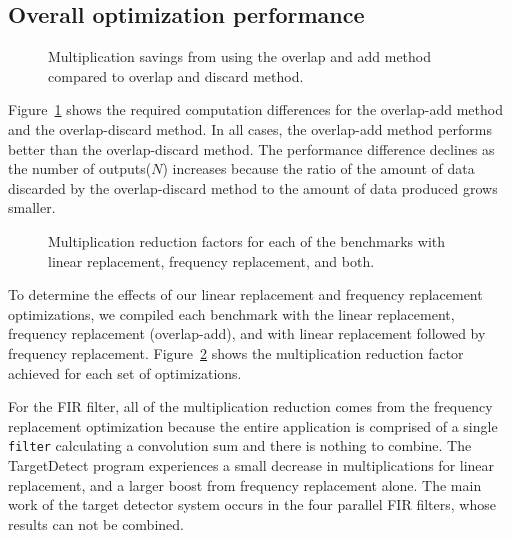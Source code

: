 \subsection{Overall optimization performance}

\begin{figure}
\center
\epsfxsize=3.2in
\vspace{-12pt}
\caption{Multiplication savings from using the overlap and add method compared to overlap and discard method.}
\label{fig:overlap-add-savings}
\vspace{-12pt}
\end{figure}

Figure~\ref{fig:overlap-add-savings} shows the required computation differences for
the overlap-add method and the overlap-discard method. 
In all cases, the overlap-add method performs better than the overlap-discard method.
The performance difference declines as the number of outputs($N$) increases because
the ratio of the amount of data discarded by the overlap-discard method to the 
amount of data produced grows smaller. 

\begin{figure}
\center
\epsfxsize=3.2in
\vspace{-6pt}
\caption{Multiplication reduction factors for each of the benchmarks with linear replacement, frequency replacement, and both.}
\label{fig:linear-freq-both}
\vspace{-12pt}
\end{figure}

To determine the effects of our linear replacement and frequency replacement 
optimizations, we compiled each benchmark with the linear 
replacement, frequency replacement (overlap-add),
and with linear replacement followed by frequency replacement. 
Figure~\ref{fig:linear-freq-both} shows the multiplication reduction factor 
achieved for each set of optimizations.

For the FIR filter, all of the multiplication reduction comes from the frequency
replacement optimization because the entire application is comprised of a single
{\tt filter} calculating a convolution sum and there is nothing to combine.
The TargetDetect program experiences a small decrease in multiplications 
for linear replacement, and a larger boost from frequency replacement alone.
The main work of the target detector system occurs in the four parallel FIR filters, whose
results can not be combined.

